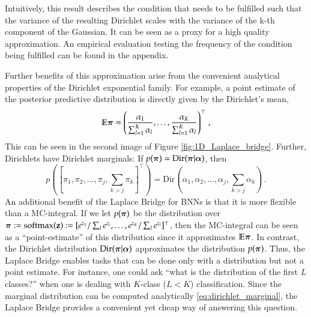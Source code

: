 Intuitively, this result describes the condition that needs to be fulfilled such that the variance of the resulting Dirichlet scales with the variance of the k-th component of the Gaussian. It can be seen as a proxy for a high quality approximation. An empirical evaluation testing the frequency of the condition being fulfilled can be found in the appendix.

Further benefits of this approximation arise from the convenient analytical properties of the Dirichlet exponential family. For example, a point estimate of the posterior predictive distribution is directly given by the Dirichlet's mean,
%
\begin{equation}\label{eq:dirichlet_mean}
    \mathbb{E}\boldsymbol{\pi} = \left( \frac{\alpha_1}{\sum_{l=1}^K \alpha_l}, \dots, \frac{\alpha_K}{\sum_{l=1}^K \alpha_l} \right)^\top \, ,
\end{equation}
%
This can be seen in the second image of Figure \ref{fig:1D_Laplace_bridge}. Further, Dirichlets have Dirichlet marginals: If $p(\boldsymbol{\pi}) = \mathrm{Dir}(\boldsymbol{\pi} | {\boldsymbol{\alpha}})$, then
\begin{equation} \label{eq:dirichlet_marginal}
     p([\pi_1,\pi_2,\dots,\pi_j,\sum_{k>j}\pi_k]^\top) = \mathrm{Dir}(\alpha_1,\alpha_2,\dots,\alpha_j,\sum_{k>j}\alpha_k) \, .
\end{equation}
An additional benefit of the Laplace Bridge for BNNs is that it is more flexible than a MC-integral. If we let $p(\boldsymbol{\pi})$ be the distribution over $\boldsymbol{\pi} := \mathrm{softmax}(\mathbf{z}) := [e^{z_1}/\sum_{l} e^{z_l}, \dots, e^{z_K}/\sum_{l} e^{z_l}]^\top$, then the MC-integral can be seen as a ``point-estimate'' of this distribution since it approximates $\mathbb{E}\boldsymbol{\pi}$. In contrast, the Dirichlet distribution $\mathrm{Dir}(\boldsymbol{\pi} | {\boldsymbol{\alpha}})$ approximates the distribution $p(\boldsymbol{\pi})$. Thus, the Laplace Bridge enables tasks that can be done only with a distribution but not a point estimate. For instance, one could ask ``what is the distribution of the first $L$ classes?'' when one is dealing with $K$-class ($L < K$) classification. Since the marginal distribution can be computed analytically \eqref{eq:dirichlet_marginal}, the Laplace Bridge provides a convenient yet cheap way of answering this question.
